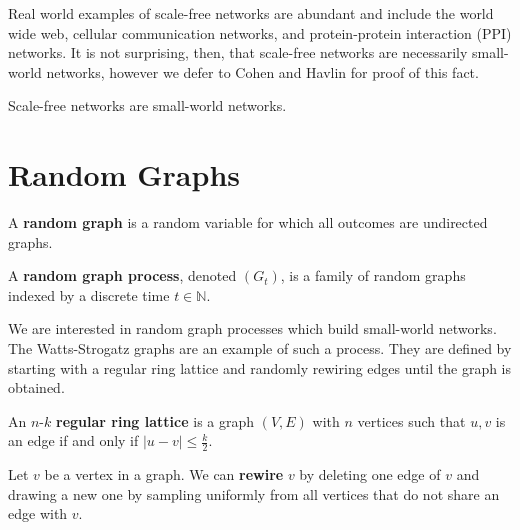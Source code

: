 Real world examples of scale-free networks are abundant and include the world
wide web, cellular communication networks, and protein-protein interaction (PPI)
networks. It is not surprising, then, that scale-free networks are necessarily
small-world networks, however we defer to Cohen and Havlin for proof of this
fact.

\begin{theorem}
  Scale-free networks are small-world networks.
\end{theorem}



\section{Random Graphs}
\label{sec:random_graphs}


\begin{definition}
  A \textbf{random graph} is a random variable for which all outcomes are
  undirected graphs.

  A \textbf{random graph process}, denoted $(G_t)$, is a family of random graphs
  indexed by a discrete time $t \in \mathbb{N}$.
\end{definition}

We are interested in random graph processes which build small-world networks.
The Watts-Strogatz graphs are an example of such a process. They are defined by
starting with a regular ring lattice and randomly rewiring edges until the graph
is obtained.

\begin{definition}
  An $n$-$k$ \textbf{regular ring lattice} is a graph $(V, E)$ with $n$ vertices
  such that $u,v$ is an edge if and only if $|u-v| \leq \frac{k}{2}$.
\end{definition}

\begin{definition}
  Let $v$ be a vertex in a graph. We can \textbf{rewire} $v$ by deleting one
  edge of $v$ and drawing a new one by sampling uniformly from all vertices that
  do not share an edge with $v$.
\end{definition}

